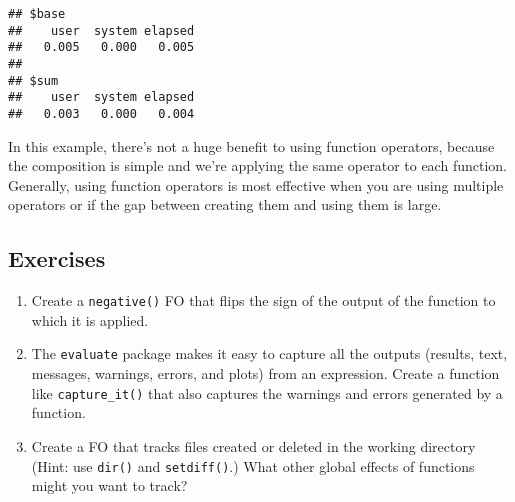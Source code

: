 \begin{Shaded}
\begin{Highlighting}[]
\StringTok{ }\NormalTok{(}
   
   \OperatorTok{/}\StringTok{ }
\NormalTok{)}
\StringTok{ }\NormalTok{(}\NormalTok{)}


\StringTok{ }
\end{Highlighting}
\end{Shaded}

\begin{verbatim}
## $base
##    user  system elapsed 
##   0.005   0.000   0.005 
## 
## $sum
##    user  system elapsed 
##   0.003   0.000   0.004
\end{verbatim}

In this example, there's not a huge benefit to using function operators,
because the composition is simple and we're applying the same operator
to each function. Generally, using function operators is most effective
when you are using multiple operators or if the gap between creating
them and using them is large.

\hypertarget{exercises-1}{%
\subsection{Exercises}\label{exercises-1}}

\begin{enumerate}
\def\labelenumi{\arabic{enumi}.}
\item
  Create a \texttt{negative()} FO that flips the sign of the output of
  the function to which it is applied.
\item
  The \texttt{evaluate} package makes it easy to capture all the outputs
  (results, text, messages, warnings, errors, and plots) from an
  expression. Create a function like \texttt{capture\_it()} that also
  captures the warnings and errors generated by a function.
\item
  Create a FO that tracks files created or deleted in the working
  directory (Hint: use \texttt{dir()} and \texttt{setdiff()}.) What
  other global effects of functions might you want to track?
\end{enumerate}

